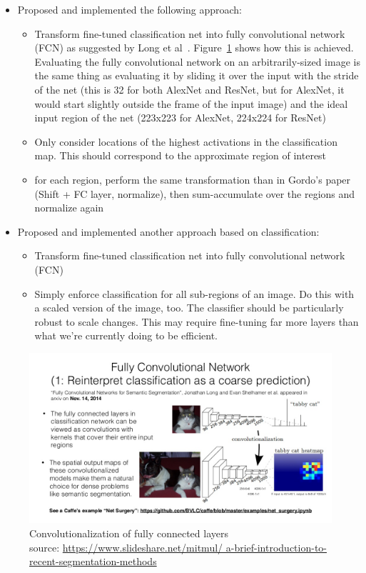 \documentclass[fleqn]{article}
\begin{document}
\begin{itemize}
    \item Proposed and implemented the following approach:
    \begin{itemize}
        \item Transform fine-tuned classification net into fully
        convolutional network (FCN) as suggested by
        Long et al~\cite{long_fully_2015}. Figure~\ref{fig:fcn} shows
        how this is achieved. Evaluating the fully convolutional network
        on an arbitrarily-sized image is the same thing as evaluating it
        by sliding it over the input with the stride of the net (this is
        32 for both AlexNet and ResNet, but for AlexNet, it would start
        slightly outside the frame of the input image) and the ideal
        input region of the net (223x223 for AlexNet, 224x224 for ResNet)
        \item Only consider locations of the highest activations
        in the classification map. This should correspond to the
        approximate region of interest
        \item for each region, perform the same transformation than
        in Gordo's paper (Shift + FC layer, normalize),
        then sum-accumulate over the regions and normalize again
    \end{itemize}
    \item Proposed and implemented another approach based on classification:
    \begin{itemize}
        \item Transform fine-tuned classification net into fully
        convolutional network (FCN)
        \item Simply enforce classification for all sub-regions of an image.
        Do this with a scaled version of the image, too. The classifier
        should be particularly robust to scale changes. This may require
        fine-tuning far more layers than what we're currently doing to be
        efficient.
    \end{itemize}
\end{itemize}

\begin{figure}
\includegraphics[width=\textwidth]{fcn_slide.jpg}
\caption[caption]{Convolutionalization of fully connected layers
\\\hspace{\textwidth}source:
\url{https://www.slideshare.net/mitmul/
a-brief-introduction-to-recent-segmentation-methods}\label{fig:fcn}}
\end{figure}
\end{document}
